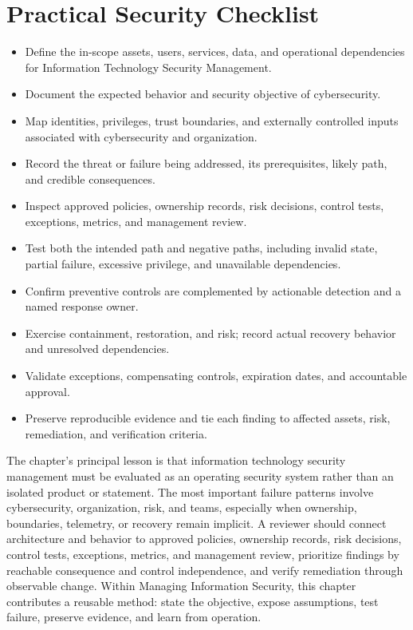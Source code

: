 \documentclass[11pt]{article}
\begin{document}
\section*{Practical Security Checklist}
\begin{itemize}[label=$\square$]
\item Define the in-scope assets, users, services, data, and operational dependencies for Information Technology Security Management.
\item Document the expected behavior and security objective of cybersecurity.
\item Map identities, privileges, trust boundaries, and externally controlled inputs associated with cybersecurity and organization.
\item Record the threat or failure being addressed, its prerequisites, likely path, and credible consequences.
\item Inspect approved policies, ownership records, risk decisions, control tests, exceptions, metrics, and management review.
\item Test both the intended path and negative paths, including invalid state, partial failure, excessive privilege, and unavailable dependencies.
\item Confirm preventive controls are complemented by actionable detection and a named response owner.
\item Exercise containment, restoration, and risk; record actual recovery behavior and unresolved dependencies.
\item Validate exceptions, compensating controls, expiration dates, and accountable approval.
\item Preserve reproducible evidence and tie each finding to affected assets, risk, remediation, and verification criteria.
\end{itemize}
\begin{synthesisbox}
The chapter's principal lesson is that information technology security management must be evaluated as an operating security system rather than an isolated product or statement. The most important failure patterns involve cybersecurity, organization, risk, and teams, especially when ownership, boundaries, telemetry, or recovery remain implicit. A reviewer should connect architecture and behavior to approved policies, ownership records, risk decisions, control tests, exceptions, metrics, and management review, prioritize findings by reachable consequence and control independence, and verify remediation through observable change. Within Managing Information Security, this chapter contributes a reusable method: state the objective, expose assumptions, test failure, preserve evidence, and learn from operation.
\end{synthesisbox}
\end{document}
